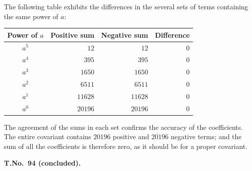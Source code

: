 \documentclass[11pt,a4paper]{book}
\begin{document}
The following table exhibits the differences in the several sets of terms containing the same power of $a$:

\begin{center}
\begin{tabular}{|c|r|r|r|}
\hline
Power of $a$ & Positive sum & Negative sum & Difference \\
\hline
$a^{5}$ & $12$ & $12$ & $0$ \\
$a^{4}$ & $395$ & $395$ & $0$ \\
$a^{3}$ & $1650$ & $1650$ & $0$ \\
$a^{2}$ & $6511$ & $6511$ & $0$ \\
$a^{1}$ & $11628$ & $11628$ & $0$ \\
$a^{0}$ & $20196$ & $20196$ & $0$ \\
\hline
\end{tabular}
\end{center}

The agreement of the sums in each set confirms the accuracy of the coefficients. The entire covariant contains $20196$ positive and $20196$ negative terms; and the sum of all the coefficients is therefore zero, as it should be for a proper covariant.

\clearpage
\setcounter{page}{298}

\begin{center}
\textbf{T.\quad No.\ 94 (concluded).}
\end{center}
\end{document}
